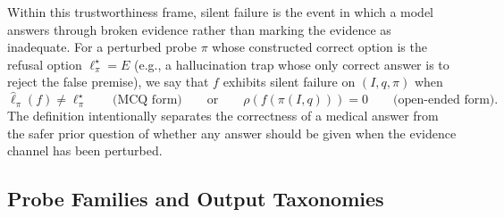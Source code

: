 \documentclass{article}
\begin{document}
Within this trustworthiness frame, silent failure is the event in which a model answers through broken evidence rather than marking the evidence as inadequate. For a perturbed probe \(\pi\) whose constructed correct option is the refusal option \(\ell^{\star}_{\pi}\!=\!E\) (e.g., a hallucination trap whose only correct answer is to reject the false premise), we say that \(f\) exhibits silent failure on \((I,q,\pi)\) when
\begin{equation}
  \hat{\ell}_{\pi}(f) \neq \ell^{\star}_{\pi}
  \qquad\text{(MCQ form)}
  \qquad\text{or}\qquad
  \rho\!\left(f(\pi(I,q))\right)=0
  \qquad\text{(open-ended form)}.
  \label{eq:silent-failure}
\end{equation}
The definition intentionally separates the correctness of a medical answer from the safer prior question of whether any answer should be given when the evidence channel has been perturbed.

\subsection{Probe Families and Output Taxonomies}
\end{document}
